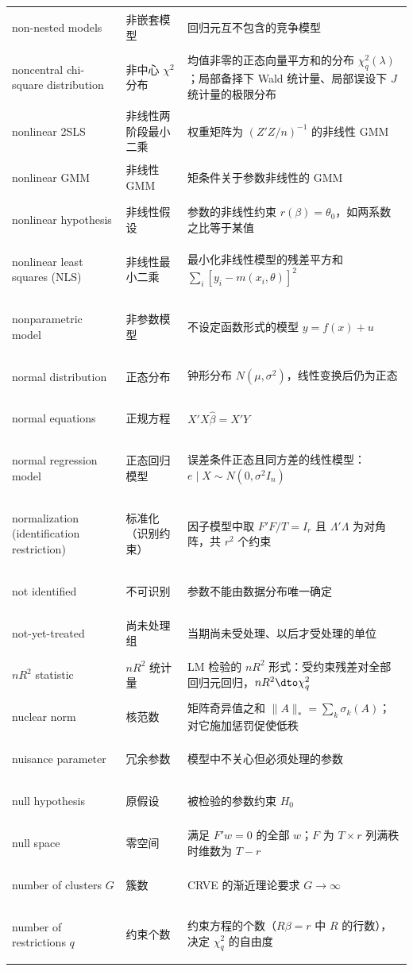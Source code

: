 \begin{longtable}{@{}>{\bfseries\boldmath\raggedright\arraybackslash}p{4.6cm}>{\raggedright\arraybackslash}p{3.2cm}>{\raggedright\arraybackslash}p{\dimexpr\textwidth-7.8cm-4\tabcolsep\relax}@{}}
non-nested models & 非嵌套模型 & 回归元互不包含的竞争模型 \\
noncentral chi-square distribution & 非中心 $\chi^2$ 分布 & 均值非零的正态向量平方和的分布 $\chi^2_q(\lambda)$；局部备择下 Wald 统计量、局部误设下 $J$ 统计量的极限分布 \\
nonlinear 2SLS & 非线性两阶段最小二乘 & 权重矩阵为 $(Z'Z/n)^{-1}$ 的非线性 GMM \\
nonlinear GMM & 非线性 GMM & 矩条件关于参数非线性的 GMM \\
nonlinear hypothesis & 非线性假设 & 参数的非线性约束 $r(\beta)=\theta_0$，如两系数之比等于某值 \\
nonlinear least squares (NLS) & 非线性最小二乘 & 最小化非线性模型的残差平方和 $\sum_i[y_i-m(x_i,\theta)]^2$ \\
nonparametric model & 非参数模型 & 不设定函数形式的模型 $y=f(x)+u$ \\
normal distribution & 正态分布 & 钟形分布 $N(\mu,\sigma^2)$，线性变换后仍为正态 \\
normal equations & 正规方程 & $X'X\hat\beta=X'Y$ \\
normal regression model & 正态回归模型 & 误差条件正态且同方差的线性模型：$e\mid X\sim N(0,\sigma^2I_n)$ \\
normalization (identification restriction) & 标准化（识别约束） & 因子模型中取 $F'F/T=I_r$ 且 $\Lambda'\Lambda$ 为对角阵，共 $r^2$ 个约束 \\
not identified & 不可识别 & 参数不能由数据分布唯一确定 \\
not-yet-treated & 尚未处理组 & 当期尚未受处理、以后才受处理的单位 \\
$nR^2$ statistic & $nR^2$ 统计量 & LM 检验的 $nR^2$ 形式：受约束残差对全部回归元回归，$nR^2\dto\chi^2_q$ \\
nuclear norm & 核范数 & 矩阵奇异值之和 $\|A\|_*=\sum_k\sigma_k(A)$；对它施加惩罚促使低秩 \\
nuisance parameter & 冗余参数 & 模型中不关心但必须处理的参数 \\
null hypothesis & 原假设 & 被检验的参数约束 $H_0$ \\
null space & 零空间 & 满足 $F'w=0$ 的全部 $w$；$F$ 为 $T\times r$ 列满秩时维数为 $T-r$ \\
number of clusters $G$ & 簇数 & CRVE 的渐近理论要求 $G\to\infty$ \\
number of restrictions $q$ & 约束个数 & 约束方程的个数（$R\beta=r$ 中 $R$ 的行数），决定 $\chi^2_q$ 的自由度 \\
\end{longtable}

